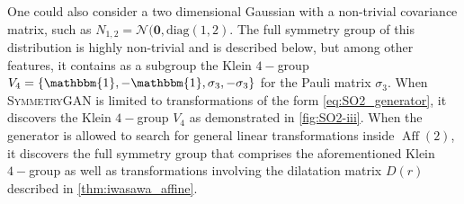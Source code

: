                 One could also consider a two dimensional Gaussian with a non-trivial covariance matrix, such as \(N_{1, 2} = \mathcal{N}(\mathbf{0}, \text{diag}(1, 2)\).
                The full symmetry group of this distribution is highly non-trivial and is described below, but among other features, it contains as a subgroup the Klein \(4-\)group \(V_4 = \qty{\mathbbm{1}, -\mathbbm{1}, \sigma_3, -\sigma_3}\) for the Pauli matrix \(\sigma_3\).
                When \textsc{SymmetryGAN} is limited to transformations of the form \cref{eq:SO2_generator}, it discovers the Klein \(4-\)group \(V_4\) as demonstrated in \cref{fig:SO2-iii}.
                When the generator is allowed to search for general linear transformations inside \(\operatorname{Aff}(2)\), it discovers the full symmetry group that comprises the aforementioned Klein \(4-\)group as well as transformations involving the dilatation matrix \(D(r)\) described in \cref{thm:iwasawa_affine}.

